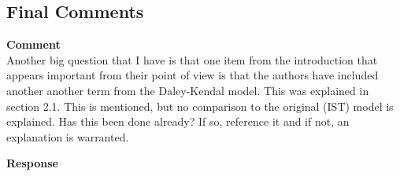 \subsection{Final Comments}

\textbf{Comment} \\
Another big question that I have is that one item from the introduction that appears important from their point of view is that the authors have included another another term from the Daley-Kendal model.
This was explained in section 2.1.
This is mentioned, but no comparison to the original (IST) model is explained. Has this been done already?
If so, reference it and if not, an explanation is warranted.

\textbf{Response} \\
